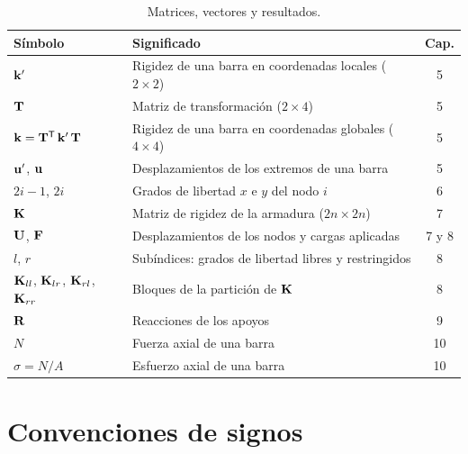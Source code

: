 \begin{table}[ht]
  \centering
  \caption{Matrices, vectores y resultados.}
  \label{tab:e_matrices}
  \small
  \begin{tabular}{@{}llc@{}}
    \toprule
    Símbolo & Significado & Cap. \\
    \midrule
    $\mathbf{k}'$ & Rigidez de una barra en coordenadas locales ($2 \times 2$) & 5 \\
    $\mathbf{T}$ & Matriz de transformación ($2 \times 4$) & 5 \\
    $\mathbf{k} = \mathbf{T}^\mathsf{T}\,\mathbf{k}'\,\mathbf{T}$ & Rigidez de una barra en coordenadas globales ($4 \times 4$) & 5 \\
    $\mathbf{u}'$, $\mathbf{u}$ & Desplazamientos de los extremos de una barra & 5 \\
    $2i - 1$, $2i$ & Grados de libertad $x$ e $y$ del nodo $i$ & 6 \\
    $\mathbf{K}$ & Matriz de rigidez de la armadura ($2n \times 2n$) & 7 \\
    $\mathbf{U}$, $\mathbf{F}$ & Desplazamientos de los nodos y cargas aplicadas & 7 y 8 \\
    $l$, $r$ & Subíndices: grados de libertad libres y restringidos & 8 \\
    $\mathbf{K}_{ll}$, $\mathbf{K}_{lr}$, $\mathbf{K}_{rl}$, $\mathbf{K}_{rr}$ & Bloques de la partición de $\mathbf{K}$ & 8 \\
    $\mathbf{R}$ & Reacciones de los apoyos & 9 \\
    $N$ & Fuerza axial de una barra & 10 \\
    $\sigma = N/A$ & Esfuerzo axial de una barra & 10 \\
    \bottomrule
  \end{tabular}
\end{table}

\section{Convenciones de signos}\label{sec:e_signos}

